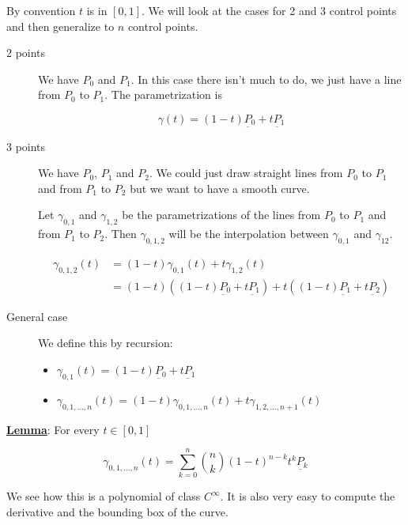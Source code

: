 \documentclass[10pt]{extarticle}
\renewcommand{\vec}[1]{\underbar{\ensuremath{#1}}}
\begin{document}
By convention $t$ is in $[0, 1]$. We will look at the cases for 2 and 3 control points and then generalize to $n$ control points.

\begin{description}
    \item[2 points] We have $P_0$ and $P_1$.
        In this case there isn't much to do, we just have a line from $P_0$ to $P_1$. The parametrization is

        $$
            \gamma(t) = (1 - t) \vec{P_0} + t \vec{P_1}
        $$

    \item[3 points] We have $P_0$, $P_1$ and $P_2$.
        We could just draw straight lines from $P_0$ to $P_1$ and from $P_1$ to $P_2$ but we want to have a smooth curve.

        Let $\gamma_{0,1}$ and $\gamma_{1,2}$ be the parametrizations of the lines from $P_0$ to $P_1$ and from $P_1$ to $P_2$.
        Then $\gamma_{0,1,2}$ will be the interpolation between $\gamma_{0,1}$ and $\gamma_{12}$.

        \begin{align*}
            \gamma_{0,1,2}(t) & = (1 - t) \gamma_{0,1}(t) + t \gamma_{1,2}(t)                                                                                   \\
                              & = (1 - t) \left((1 - t) \vec{P_0} + t \vec{P_1}\right) + t \left((1 - t) \vec{P_1} + t \vec{P_2}\right)
        \end{align*}

    \item[General case] We define this by recursion:
        \begin{itemize}
            \item $\gamma_{0,1}(t) = (1 - t) \vec{P_0} + t \vec{P_1}$
            \item $\gamma_{0,1, \ldots, n}(t) = (1 - t) \gamma_{0,1, \ldots, n}(t) + t \gamma_{1,2, \ldots, n+1}(t)$
        \end{itemize}
\end{description}

\textbf{\underline{Lemma}}:
For every $t \in [0, 1]$

$$
    \gamma_{0,1, \ldots, n}(t) = \sum_{k=0}^n \binom{n}{k} (1 - t)^{n-k} t^k \vec{P_k}
$$

We see how this is a polynomial of class $C^\infty$. It is also very easy to compute the derivative and the bounding box of the curve.
\end{document}
